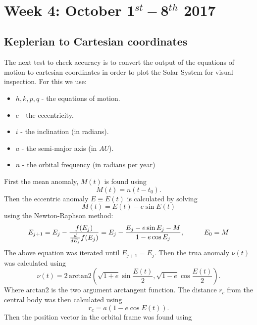 \documentclass[11pt, oneside]{article}   	%
\begin{document}
\newpage
\
\newpage

\section{Week 4: October 1$^{st} - $8$^{th}$ 2017}

\subsection{Keplerian to Cartesian coordinates}

The next test to check accuracy is to convert the output of the equations of motion to cartesian coordinates in order to plot the Solar System for visual inspection. For this we use:
\begin{itemize}
\item $h, k, p, q$ - the equations of motion.
\item $e$ - the eccentricity.
\item $i$ - the inclination (in radians).
\item $a$ - the semi-major axis (in $AU$).
\item $n$ - the orbital frequency (in radians per year)
\end{itemize}
First the mean anomaly, $M(t)$ is found using
\begin{equation}
M(t) = n(t-t_{0}).
\end{equation}
Then the eccentric anomaly $E \equiv E(t)$ is calculated by solving
\begin{equation}
M(t) = E(t) - e\sin E(t)
\end{equation}
using the Newton-Raphson method:
\begin{equation}
E_{j+1} = E_{j} - \frac{f(E_{j})}{\frac{d}{dE_{j}}f(E_{j})} = E_{j} - \frac{E_{j} - e\sin E_{j} - M}{1-e\cos E_{j}}, \hspace*{1cm} E_{0}=M
\end{equation}
The above equation was iterated until $E_{j+1} = E_{j}$. Then the trua anomaly $\nu(t)$ was calculated using
\begin{equation}
\nu(t) = 2 \, \text{arctan2} \left (\sqrt{1+e} \sin \frac{E(t)}{2}, \sqrt{1-e} \cos \frac{E(t)}{2} \right).
\end{equation}
Where $ \text{arctan2}$ is the two argument arctangent function. The distance $r_{c}$ from the central body was then calculated using
\begin{equation}
r_{c} = a(1-e \cos E(t)).
\end{equation}
Then the position vector in the orbital frame was found using
\end{document}
